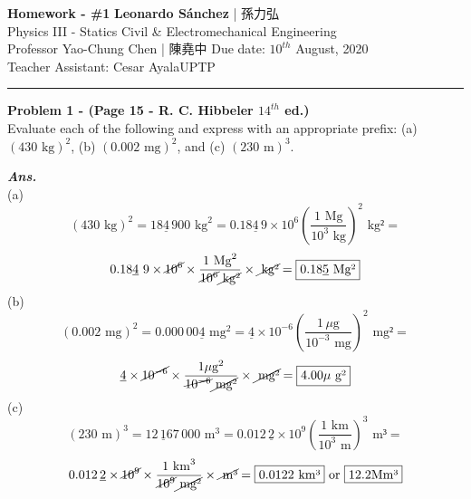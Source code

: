 \documentclass[letterpaper, 11pt]{article}
\newenvironment{problem}[2][Problem]
    { \begin{mdframed} \textbf{#1 #2} \\}
    {  \end{mdframed}}
\newenvironment{solution}
    {\textbf{\textit{Ans.}}\\}
    { }
\begin{document}
\noindent
\large\textbf{Homework - \#1} \hfill \textbf{Leonardo Sánchez} |  孫\text{ }力弘   \\
Physics III - Statics \hfill Civil \& Electromechanical Engineering \\
Professor Yao-Chung Chen | 陳\text{ }堯中 \hfill Due date: $10^{th}$ August, 2020\\
Teacher Assistant: Cesar Ayala\hfill UPTP \\
\noindent\rule{7.5in}{2.8pt}
\begin{problem}{1 - (Page 15 - R. C. Hibbeler $14^{th}$ ed.)}
    Evaluate each of the following and express with an appropriate prefix:
     (a) $(430 \text{ kg})^2$, (b) $(0.002\text{ mg})^2$, and
    (c) $(230\text{ m})^3$.
\end{problem}
\begin{solution}
(a)
    \[(430\text{ kg})^2=18\underline{4}\, 900\text{ kg}^2 = 0.18\underline{4}\, 9\times 10^6 \left(\frac{1 \text{ Mg}}{10^3 \text{ kg}}\right)^2 \text{ kg²}=\]
    \[0.18\underline{4}\,\, 9\times \cancel{10^6} \times \frac{1 \text{ Mg}^2}{\cancel{10^6} \cancel{\text{ kg²}}}\times \cancel{\text{ kg²}}=\boxed{0.18\underline{5}\text{ Mg²}}\]
\end{solution}
(b)
    \[(0.002\text{ mg})^2=0.000\,00\underline{4}\text{ mg}^2 = \underline{4}\times 10^{-6} \left(\frac{1 \,\mu\text{g}}{10^{-3} \text{ mg}}\right)^2 \text{ mg²}=\]
    \[\underline{4}\times \cancel{10^{-6}} \times \frac{1 \mu \text{g}^2}{\cancel{10^{-6}} \cancel{\text{ mg²}}}\times \cancel{\text{ mg²}}=\boxed{4.00\mu\text{ g²}}\]
(c)
    \[(230 \text{ m})^3=12\,\underline{1}67\,000\text{ m}^3 =0.012\,\underline{2}\times 10^{9} \left(\frac{1 \text{ km}}{10^{3} \text{ m}}\right)^3 \text{ m³}=\]
    \[0.012\,\underline{2}\times \cancel{10^{9}} \times \frac{1 \text{ km}^3}{\cancel{10^{9}} \cancel{\text{ mg²}}}\times \cancel{\text{ m³}}=\boxed{0.0122\text{ km³}}\text{ or }\boxed{12.2 \text{Mm³}}\]
\end{document}
